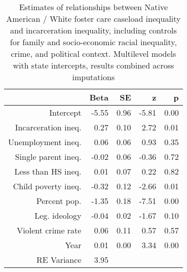 \begin{table}[ht]
\centering
\caption{Estimates of relationships between Native American / White foster care caseload inequality and incarceration inequality, including controls for family and socio-economic racial inequality, crime, and political context. Multilevel models with state intercepts, results combined across imputations} 
\begin{tabular}{rrrrr}
  \hline
 & Beta & SE & z & p \\ 
  \hline
Intercept & -5.55 & 0.96 & -5.81 & 0.00 \\ 
  Incarceration ineq. & 0.27 & 0.10 & 2.72 & 0.01 \\ 
  Unemployment ineq. & 0.06 & 0.06 & 0.93 & 0.35 \\ 
  Single parent ineq. & -0.02 & 0.06 & -0.36 & 0.72 \\ 
  Less than HS ineq. & 0.01 & 0.07 & 0.22 & 0.82 \\ 
  Child poverty ineq. & -0.32 & 0.12 & -2.66 & 0.01 \\ 
  Percent pop. & -1.35 & 0.18 & -7.51 & 0.00 \\ 
  Leg. ideology & -0.04 & 0.02 & -1.67 & 0.10 \\ 
  Violent crime rate & 0.06 & 0.11 & 0.57 & 0.57 \\ 
  Year & 0.01 & 0.00 & 3.34 & 0.00 \\ 
  RE Variance & 3.95 &  &  &  \\ 
   \hline
\end{tabular}
\end{table}
